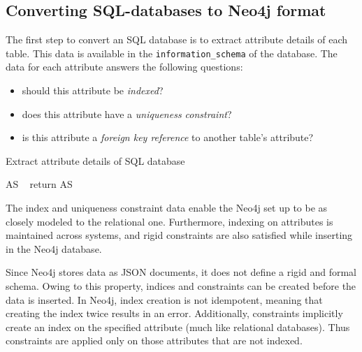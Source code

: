 \documentclass[12pt]{article}
\begin{document}
    \subsection{Converting SQL-databases to Neo4j format}
    The first step to convert an SQL database is to extract attribute details of each table. This data is available in the \verb|information_schema| of the database. The data for each attribute answers the following questions:
    \begin{itemize}
        \item should this attribute be \textit{indexed}?
        \item does this attribute have a \textit{uniqueness constraint}?
        \item is this attribute a \textit{foreign key reference} to another table's attribute?
    \end{itemize}

    \begin{algorithm}[htb!]
        \SetAlgoLined
        \caption{Extract attribute details of SQL database}
        AS \gets\ \phi{}
        return AS\;
        \label{algo:sql_attr_set}
    \end{algorithm}

    The index and uniqueness constraint data enable the Neo4j set up to be as closely modeled to the relational one. Furthermore, indexing on attributes is maintained across systems, and rigid constraints are also satisfied while inserting in the Neo4j database.

    Since Neo4j stores data as JSON documents, it does not define a rigid and formal schema. Owing to this property, indices and constraints can be created before the data is inserted. In Neo4j, index creation is not idempotent, meaning that creating the index twice results in an error. Additionally, constraints implicitly create an index on the specified attribute (much like relational databases). Thus constraints are applied only on those attributes that are not indexed.
\end{document}
